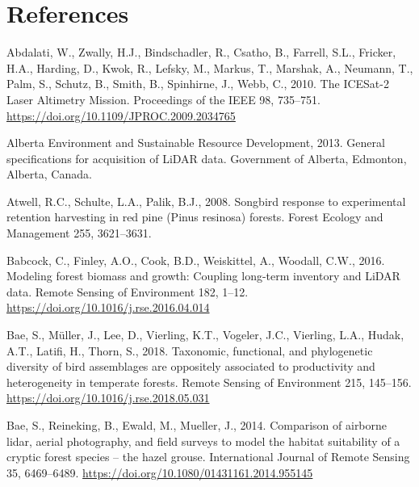 \documentclass[
  12pt,
]{article}
\newlength{\cslhangindent}
\newlength{\cslentryspacingunit} %
\newenvironment{CSLReferences}[2] %
 {%
  \setlength{\parindent}{0pt}
  \ifodd #1
  \let\oldpar\par
  \def\par{\hangindent=\cslhangindent\oldpar}
  \fi
  \setlength{\parskip}{#2\cslentryspacingunit}
 }%
 {}
\begin{document}
\pagebreak

\hypertarget{references}{%
\section*{References}\label{references}}

\hypertarget{refs}{}
\begin{CSLReferences}{1}{0}
\leavevmode{}%
Abdalati, W., Zwally, H.J., Bindschadler, R., Csatho, B., Farrell, S.L., Fricker, H.A., Harding, D., Kwok, R., Lefsky, M., Markus, T., Marshak, A., Neumann, T., Palm, S., Schutz, B., Smith, B., Spinhirne, J., Webb, C., 2010. The {ICESat}-2 {Laser} {Altimetry} {Mission}. Proceedings of the IEEE 98, 735--751. \url{https://doi.org/10.1109/JPROC.2009.2034765}

\leavevmode{}%
Alberta Environment and Sustainable Resource Development, 2013. General specifications for acquisition of {LiDAR} data. Government of Alberta, Edmonton, Alberta, Canada.

\leavevmode{}%
Atwell, R.C., Schulte, L.A., Palik, B.J., 2008. Songbird response to experimental retention harvesting in red pine ({Pinus} resinosa) forests. Forest Ecology and Management 255, 3621--3631.

\leavevmode{}%
Babcock, C., Finley, A.O., Cook, B.D., Weiskittel, A., Woodall, C.W., 2016. Modeling forest biomass and growth: {Coupling} long-term inventory and {LiDAR} data. Remote Sensing of Environment 182, 1--12. \url{https://doi.org/10.1016/j.rse.2016.04.014}

\leavevmode{}%
Bae, S., Müller, J., Lee, D., Vierling, K.T., Vogeler, J.C., Vierling, L.A., Hudak, A.T., Latifi, H., Thorn, S., 2018. Taxonomic, functional, and phylogenetic diversity of bird assemblages are oppositely associated to productivity and heterogeneity in temperate forests. Remote Sensing of Environment 215, 145--156. \url{https://doi.org/10.1016/j.rse.2018.05.031}

\leavevmode{}%
Bae, S., Reineking, B., Ewald, M., Mueller, J., 2014. Comparison of airborne lidar, aerial photography, and field surveys to model the habitat suitability of a cryptic forest species -- the hazel grouse. International Journal of Remote Sensing 35, 6469--6489. \url{https://doi.org/10.1080/01431161.2014.955145}


\end{CSLReferences}
\end{document}
